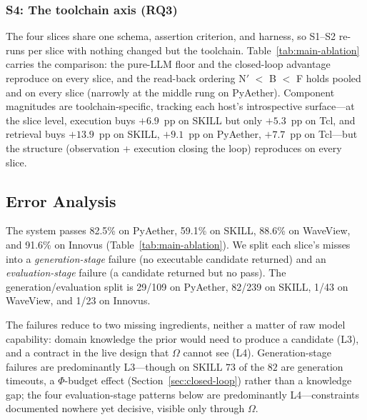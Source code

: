 \subsubsection{S4: The toolchain axis (RQ3)}
\label{sec:cross-language}

The four slices share one schema, assertion criterion, and harness, so S1--S2 re-runs per slice with nothing changed but the toolchain. Table~\ref{tab:main-ablation} carries the comparison: the pure-LLM floor and the closed-loop advantage reproduce on every slice, and the read-back ordering N$'$ $<$ B $<$ F holds pooled and on every slice (narrowly at the middle rung on PyAether). Component magnitudes are toolchain-specific, tracking each host's introspective surface---at the slice level, execution buys $+6.9$~pp on SKILL but only $+5.3$~pp on Tcl, and retrieval buys $+13.9$~pp on SKILL, $+9.1$~pp on PyAether, $+7.7$~pp on Tcl---but the structure (observation + execution closing the loop) reproduces on every slice.

\subsection{Error Analysis}
\label{sec:error-analysis}

The system passes 82.5\% on PyAether, 59.1\% on SKILL, 88.6\% on WaveView, and 91.6\% on Innovus (Table~\ref{tab:main-ablation}). We split each slice's misses into a \emph{generation-stage} failure (no executable candidate returned) and an \emph{evaluation-stage} failure (a candidate returned but no pass). The generation/evaluation split is 29/109 on PyAether, 82/239 on SKILL, 1/43 on WaveView, and 1/23 on Innovus.

The failures reduce to two missing ingredients, neither a matter of raw model capability: domain knowledge the prior would need to produce a candidate (L3), and a contract in the live design that $\Omega$ cannot see (L4). Generation-stage failures are predominantly L3---though on SKILL $73$ of the $82$ are generation timeouts, a $\Phi$-budget effect (Section~\ref{sec:closed-loop}) rather than a knowledge gap; the four evaluation-stage patterns below are predominantly L4---constraints documented nowhere yet decisive, visible only through $\Omega$.

